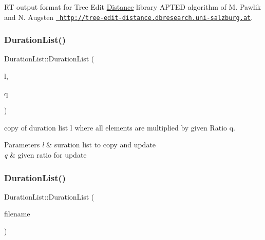 RT output format for Tree Edit \mbox{\hyperlink{classDistance}{Distance}} library A\+P\+T\+ED algorithm of M. Pawlik and N. Augsten \href{http://tree-edit-distance.dbresearch.uni-salzburg.at}{\texttt{ http\+://tree-\/edit-\/distance.\+dbresearch.\+uni-\/salzburg.\+at}}. \mbox{\label{group__output_ga95ba6b1b14592003fdc97b69f982677c}} 
\subsubsection{\texorpdfstring{DurationList()}{DurationList()}\hspace{0.1cm}{\footnotesize\ttfamily [1/2]}}
{\footnotesize\ttfamily Duration\+List\+::\+Duration\+List (\begin{DoxyParamCaption}\item[{const \mbox{\hyperlink{classDurationList}{Duration\+List}} \&}]{l,  }\item[{\mbox{\hyperlink{classRational}{Rational}}}]{q }\end{DoxyParamCaption})}



copy of duration list l where all elements are multiplied by given Ratio q. 


\begin{DoxyParams}{Parameters}
{\em l} & suration list to copy and update \\
\hline
{\em q} & given ratio for update \\
\hline
\end{DoxyParams}
\mbox{\label{group__output_gab678d41f41605596499c3f17a5f39120}} 
\subsubsection{\texorpdfstring{DurationList()}{DurationList()}\hspace{0.1cm}{\footnotesize\ttfamily [2/2]}}
{\footnotesize\ttfamily Duration\+List\+::\+Duration\+List (\begin{DoxyParamCaption}\item[{std\+::string}]{filename }\end{DoxyParamCaption})}



